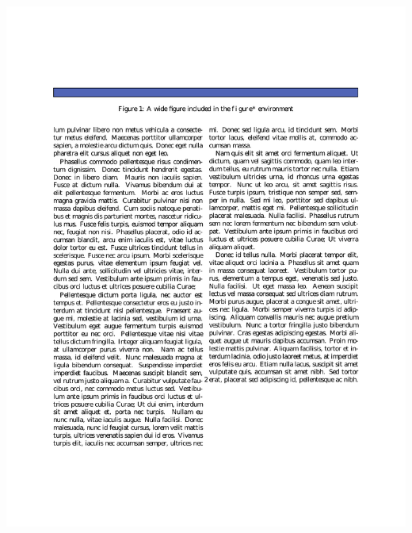 \documentclass[article]{beamer}
\begin{document}
\begin{frame}
\begin{columns}
\begin{column}{0.5\textwidth}
      \colorbox{white}{\includegraphics[height=0.9\textheight]{two_column_wide_figure_example_page_2.pdf}}
    \end{column}
  \end{columns}
\end{frame}
\end{document}
